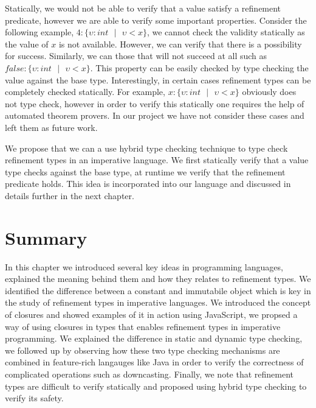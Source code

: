 \documentclass[a4paper,12pt]{report}
\begin{document}
\par
Statically, we would not be able to verify that a value satisfy a refinement 
predicate, however we are able to verify some important properties. Consider the 
following example, $4 : \{\upsilon : int\text{ }|\text{ }\upsilon < x\}$, we 
cannot check the validity statically as the value of $x$ is not available. 
However, we can verify that there is a possibility for success. Similarly, we 
can those that will not succeed at all such as 
$\textit{false} : \{\upsilon : int\text{ }|\text{ }\upsilon < x\}$. This 
property can be easily checked by type checking the value against the base type. 
Interestingly, in certain cases refinement types can be completely checked 
statically. For example, $x : \{\upsilon : int\text{ }|\text{ }\upsilon < x\}$ 
obviously does not type check, however in order to verify this statically one 
requires the help of automated theorem provers. In our project we have not 
consider these cases and left them as future work. 

\par
We propose that we can a use hybrid type checking technique to type check 
refinement types in an imperative language. We first statically verify that 
a value type checks against the base type, at runtime we verify that the 
refinement predicate holds. This idea is incorporated into our language 
and discussed in details further in the next chapter. 

\section{Summary}
In this chapter we introduced several key ideas in programming languages, 
explained the meaning behind them and how they relates to refinement types. 
We identified the difference between a constant and 
immutabile object which is key in the study of refinement types in 
imperative languages. We introduced the concept of closures and showed examples 
of it in action using JavaScript, we propsed a way of using closures 
in types that enables refinement types in imperative programming. 
We explained the difference in static 
and dynamic type checking, we followed up by observing how these two type 
checking mechanisms are combined in feature-rich langauges like Java in order to 
verify the correctness of complicated operations such as downcasting. Finally, 
we note that refinement types are difficult to verify statically and proposed 
using hybrid type checking to verify its safety. 
\end{document}
